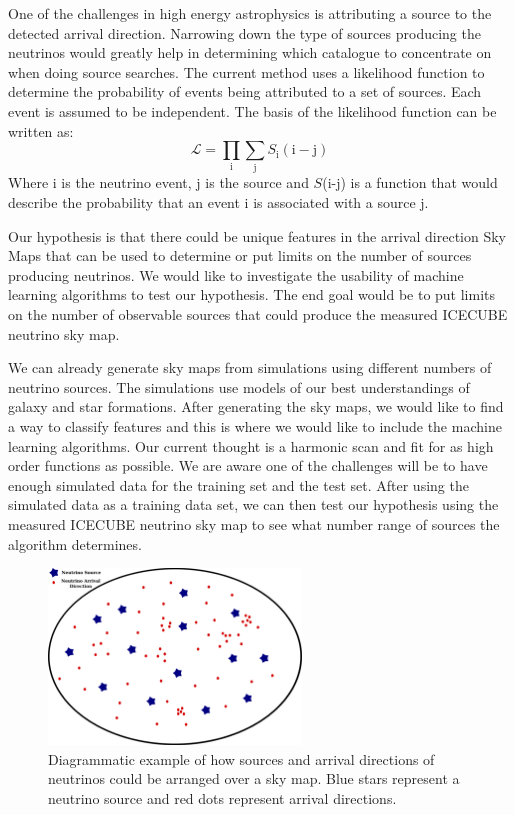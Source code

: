 \documentclass[a4paper,12pt,twoside]{article}
\begin{document}
One of the challenges in high energy astrophysics is attributing a source to the detected arrival direction. Narrowing down the type of sources producing the neutrinos would greatly help in determining which catalogue to concentrate on when doing source searches. The current method uses a likelihood function to determine the probability of events being attributed to a set of sources. Each event is assumed to be independent. The basis of the likelihood function can be written as:
\begin{equation}
\mathcal{L} = \prod_{\mathrm{i}} \sum_{\mathrm{j}} S_{\mathrm{i}}(\mathrm{i} - \mathrm{j})
\end{equation}
Where i is the neutrino event, j is the source and $S$(i-j) is a function that would describe the probability that an event i is associated with a source j.


Our hypothesis is that there could be unique features in the arrival direction Sky Maps that can be used to determine or put limits on the number of sources producing neutrinos. We would like to investigate the usability of machine learning algorithms to test our hypothesis. The end goal would be to put limits on the number of observable sources that could produce the measured ICECUBE neutrino sky map.


We can already generate sky maps from simulations using different numbers of neutrino sources. The simulations use models of our best understandings of galaxy and star formations. After generating the sky maps, we would like to find a way to classify features and this is where we would like to include the machine learning algorithms. Our current thought is a harmonic scan and fit for as high order functions as possible. We are aware one of the challenges will be to have enough simulated data for the training set and the test set. After using the simulated data as a training data set, we can then test our hypothesis using the measured ICECUBE neutrino sky map to see what number range of sources the algorithm determines.


\begin{figure}[!htp]
\centering
\includegraphics[width=0.6\textwidth]{MockNeutrinoMap.png}
\caption{Diagrammatic example of how sources and arrival directions
of neutrinos could be arranged over a sky map. Blue stars represent a neutrino source and red dots represent arrival directions.}
\label{fig:SourceEventEx}
\end{figure}
\end{document}
